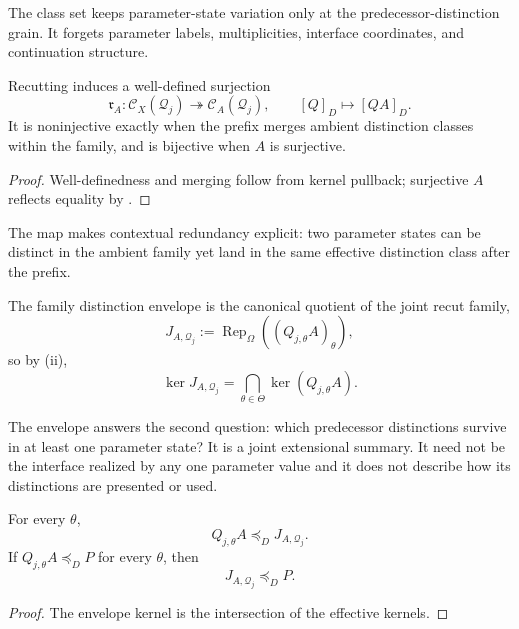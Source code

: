 The class set keeps parameter-state variation only at the predecessor-distinction grain. It forgets parameter labels, multiplicities, interface coordinates, and continuation structure.

\begin{proposition}\label{prop:context-reduction-v13}
Recutting induces a well-defined surjection
\[
\boxed{
\mathfrak r_A:
\mathcal C_X(\mathcal Q_j)
\twoheadrightarrow
\mathcal C_A(\mathcal Q_j),
\qquad
[Q]_D\longmapsto[QA]_D.
}
\]
It is noninjective exactly when the prefix merges ambient distinction classes within the family, and is bijective when $A$ is surjective.
\end{proposition}

\begin{proof}
Well-definedness and merging follow from kernel pullback; surjective $A$ reflects equality by .
\end{proof}

The map makes contextual redundancy explicit: two parameter states can be distinct in the ambient family yet land in the same effective distinction class after the prefix.

\begin{definition}\label{def:family-envelope-v13}
The family distinction envelope is the canonical quotient of the joint recut family,
\[
\boxed{
J_{A,\mathcal Q_j}
:=
\operatorname{Rep}_\Omega((Q_{j,\theta}A)_\theta),
}
\]
so by (ii),
\[
\boxed{
\ker J_{A,\mathcal Q_j}
=
\bigcap_{\theta\in\Theta}\ker(Q_{j,\theta}A).
}
\]
\end{definition}

The envelope answers the second question: which predecessor distinctions survive in at least one parameter state? It is a joint extensional summary. It need not be the interface realized by any one parameter value and it does not describe how its distinctions are presented or used.

\begin{corollary}\label{cor:family-envelope-v13}
For every $\theta$,
\[
Q_{j,\theta}A\preceq_DJ_{A,\mathcal Q_j}.
\]
If $Q_{j,\theta}A\preceq_DP$ for every $\theta$, then
\[
J_{A,\mathcal Q_j}\preceq_DP.
\]
\end{corollary}

\begin{proof}
The envelope kernel is the intersection of the effective kernels.
\end{proof}

